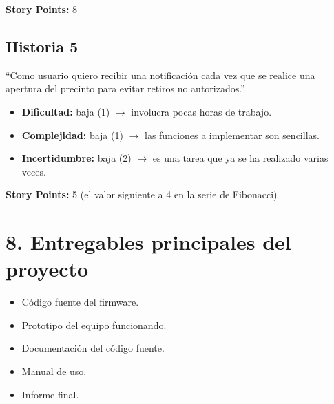 \documentclass[
11pt, %
]{charter}
\begin{document}
\textbf{Story Points:} 8 

\subsection{Historia 5}
``Como usuario quiero recibir una notificación cada vez que se realice una apertura del precinto para evitar retiros no autorizados.''

\begin{itemize}
	\item \textbf{Dificultad:} baja (1) $\rightarrow$ involucra pocas horas de trabajo.
	\item \textbf{Complejidad:} baja (1) $\rightarrow$ las funciones a implementar son sencillas.
	\item \textbf{Incertidumbre:} baja (2) $\rightarrow$ es una tarea que ya se ha realizado varias veces.
\end{itemize}

\textbf{Story Points:} 5 (el valor siguiente a 4 en la serie de Fibonacci) 

%
%

\section{8. Entregables principales del proyecto}
\label{sec:entregables}

\begin{itemize}
	\item Código fuente del firmware.
	\item Prototipo del equipo funcionando.
	\item Documentación del código fuente.
	\item Manual de uso.
	\item Informe final.
\end{itemize}
\end{document}
